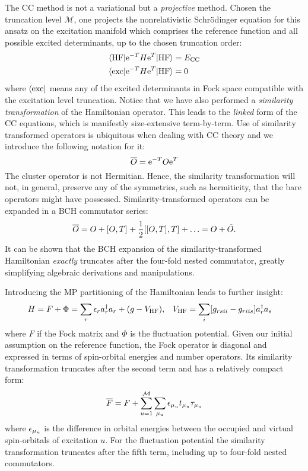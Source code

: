 The \acrshort{CC} method is not a variational but a \emph{projective} method.
Chosen the truncation level $\mathcal{M}$, one projects the
nonrelativistic Schrödinger equation for this ansatz on the excitation
manifold which comprises the reference function and all possible excited
determinants, up to the chosen truncation order:
\begin{subequations}
  \begin{align}
    \braket{\mathrm{HF} | \mathrm{e}^{-T}H\mathrm{e}^{T} | \mathrm{HF}} &= E_\mathrm{CC} \\
    \braket{\mathrm{exc} | \mathrm{e}^{-T}H\mathrm{e}^{T} | \mathrm{HF}} &= 0
  \end{align}
\end{subequations}
where $\bra{\mathrm{exc}}$ means any of the excited determinants in Fock
space compatible with the excitation level truncation.
Notice that we have also performed a \emph{similarity transformation} of
the Hamiltonian operator. This leads to the \emph{linked} form of the
\acrshort{CC} equations, which is manifestly size-extensive term-by-term.
Use of similarity transformed operators is ubiquitous when dealing with
\acrshort{CC} theory and we introduce the following notation for it:
\begin{equation}\label{eq:similarity-transformation}
  \overline{O} =\mathrm{e}^{-T}O\mathrm{e}^{T}
\end{equation}
The cluster operator is not Hermitian. Hence, the similarity transformation
will not, in general, preserve any of the symmetries, such as
hermiticity, that the bare operators might have possessed.
Similarity-transformed operators can be expanded in a \acrshort{BCH}
commutator series:
\begin{equation}\label{eq:bch}
  \overline{O}
  =
  O + [ O, T ]^{} + \frac{1}{2}[ [ O, T ]^{}, T ]^{} + \ldots
  =
  O + \tilde{O}.
\end{equation}
It can be shown that the \acrshort{BCH} expansion of the
similarity-transformed Hamiltonian \emph{exactly} truncates after the
four-fold nested commutator, greatly simplifying algebraic derivations
and manipulations.\autocite{Helgaker2000-tz}

Introducing the \gls{MP} partitioning of the Hamiltonian leads to
further insight:
\begin{alignat}{2}
 H = F + \Phi = \sum_r\epsilon_ra_{r}^{\dagger}a_{r} + (g- V_\mathrm{HF}),
 \quad&
 V_\mathrm{HF} = \sum_{i}[g_{rsii} - g_{riis}]a_{r}^{\dagger}a_{s}
\end{alignat}
where $F$ if the Fock matrix and $\Phi$ is the fluctuation potential.
Given our initial assumption on the reference function, the Fock
operator is diagonal and expressed in terms of spin-orbital energies and
number operators.
Its similarity transformation truncates after the second term and has a
relatively compact form:
\begin{equation}
  \overline{F} = F + \sum_{u=1}^\mathcal{M}\sum_{\mu_u}\epsilon_{\mu_u}t_{\mu_u}\tau_{\mu_u}
\end{equation}
where $\epsilon_{\mu_u}$ is the difference in orbital energies between the
occupied and virtual spin-orbitals of excitation $u$.
For the fluctuation potential the similarity transformation truncates
after the fifth term, including up to four-fold nested commutators.

